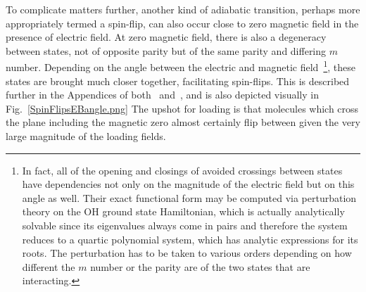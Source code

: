 \documentclass[defaultstyle,11pt]{thesis}
\begin{document}
To complicate matters further, another kind of adiabatic transition, perhaps more appropriately termed a spin-flip, can also occur close to zero magnetic field in the presence of electric field.
At zero magnetic field, there is also a degeneracy between states, not of opposite parity but of the same parity and differing $m$ number.
Depending on the angle between the electric and magnetic field~\footnote{In fact, all of the opening and closings of avoided crossings between states have dependencies not only on the magnitude of the electric field but on this angle as well. Their exact functional form may be computed via perturbation theory on the OH ground state Hamiltonian, which is actually analytically solvable since its eigenvalues always come in pairs and therefore the system reduces to a quartic polynomial system, which has analytic expressions for its roots. The perturbation has to be taken to various orders depending on how different the $m$ number or the parity are of the two states that are interacting.}, these states are brought much closer together, facilitating spin-flips.
This is described further in the Appendices of both~\cite{Stuhl2013} and~\citep[App.~A]{Reens2017}, and is also depicted visually in Fig.~\ref{SpinFlipsEBangle.png}
The upshot for loading is that molecules which cross the plane including the magnetic zero almost certainly flip between  given the very large magnitude of the loading fields.

\end{document}
